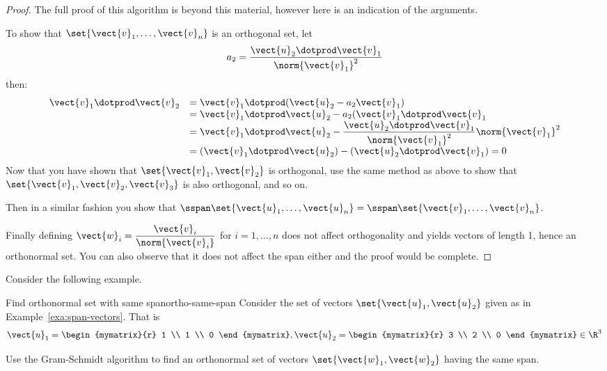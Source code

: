 \begin{proof}
The full proof of this algorithm is beyond this material, however here is an indication of the arguments. 

To show that  $\set{\vect{v}_1,\ldots, \vect{v}_n  } $ is an orthogonal set, let 
\[ a_2 =  \dfrac{ \vect{u}_2 \dotprod \vect{v}_1}{\norm{\vect{v}_1}^2} \]
then: 
\[
\begin{array}{ll}
 \vect{v}_1 \dotprod \vect{v}_2 &  =  \vect{v}_1 \dotprod (\vect{u}_2 - a_2 \vect{v}_1)  \\
 & = \vect{v}_1 \dotprod \vect{u}_2 - a_2 (\vect{v}_1 \dotprod \vect{v}_1  \\
 & = \vect{v}_1 \dotprod \vect{u}_2 - \dfrac{ \vect{u}_2 \dotprod \vect{v}_1}{\norm{\vect{v}_1}^2} \norm{\vect{v}_1}^2 \\
 & = ( \vect{v}_1 \dotprod \vect{u}_2 ) - ( \vect{u}_2 \dotprod \vect{v}_1 ) =0\\
\end{array}
\]
Now that you have shown that $\set{\vect{v}_1, \vect{v}_2}$ is orthogonal,  use the same method as above to show that 
$\set{\vect{v}_1, \vect{v}_2, \vect{v}_3}$ is also orthogonal,  and so on. 

Then in a similar fashion you show that $\sspan\set{
\vect{u}_1,\ldots,\vect{u}_n } = \sspan\set{
\vect{v}_1,\ldots,\vect{v}_n }$.

Finally defining $\vect{w}_i =
\dfrac{\vect{v}_i}{\norm{\vect{v}_i}}$ for $i=1,\ldots,n$ does not affect orthogonality and yields vectors of length 1,
hence an orthonormal set. You can also observe that it does not affect
the span either and the proof would be complete.
\end{proof}

Consider the following example.

\begin{example}{Find orthonormal set with same span}{ortho-same-span}
Consider the set of vectors $\set{\vect{u}_1, \vect{u}_2}$ given as in Example~\ref{exa:span-vectors}. That is  
\[
\vect{u}_1=\begin{mymatrix}{r}
1 \\
1 \\
0
\end{mymatrix}, \vect{u}_2=\begin{mymatrix}{r}
3 \\
2 \\
0
\end{mymatrix} \in \R^{3} 
\]

Use the Gram-Schmidt algorithm to find an orthonormal set of vectors $\set{\vect{w}_1, \vect{w}_2}$ having the same span.
\end{example}

